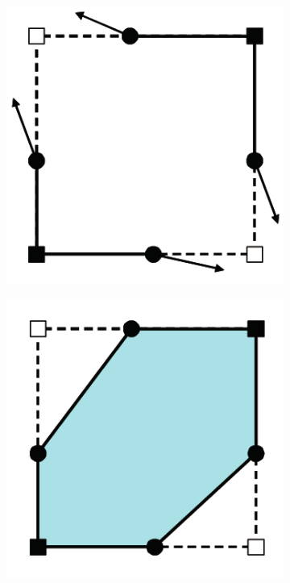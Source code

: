 \begin{figure}
\begin{center}
\begin{subfigure}[t]{.2\textwidth}
\begin{center}
\includegraphics[width=\textwidth]{Pictures/SurfaceReconstruction/ManifoldDC1.png}
\label{sfig:ManifoldDC1}
\end{center}
\end{subfigure}
\qquad
\begin{subfigure}[t]{.2\textwidth}
\begin{center}
\includegraphics[width=\textwidth]{Pictures/SurfaceReconstruction/ManifoldDC2.png}

\end{center}
\end{subfigure}
\end{center}
\end{figure}
